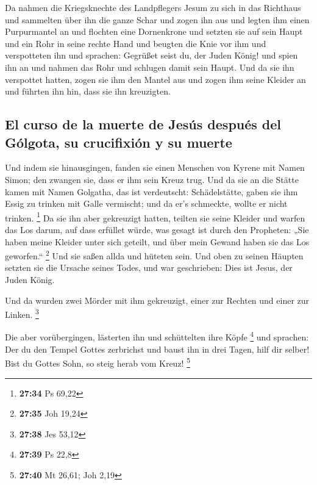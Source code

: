  Da nahmen die Kriegsknechte des Landpflegers Jesum zu
sich in das Richthaus und sammelten über ihn die ganze Schar
 und zogen ihn aus und legten ihm einen Purpurmantel an
 und flochten eine Dornenkrone und setzten sie auf sein
Haupt und ein Rohr in seine rechte Hand und beugten die Knie vor ihm und
verspotteten ihn und sprachen: Gegrüßet seist du, der Juden König!
 und spien ihn an und nahmen das Rohr und schlugen damit
sein Haupt.  Und da sie ihn verspottet hatten, zogen sie
ihm den Mantel aus und zogen ihm seine Kleider an und führten ihn hin,
dass sie ihn kreuzigten.

\hypertarget{el-curso-de-la-muerte-de-jesuxfas-despuuxe9s-del-guxf3lgota-su-crucifixiuxf3n-y-su-muerte}{%
\subsection{El curso de la muerte de Jesús después del Gólgota, su
crucifixión y su
muerte}\label{el-curso-de-la-muerte-de-jesuxfas-despuuxe9s-del-guxf3lgota-su-crucifixiuxf3n-y-su-muerte}}

 Und indem sie hinausgingen, fanden sie einen Menschen
von Kyrene mit Namen Simon; den zwangen sie, dass er ihm sein Kreuz
trug.  Und da sie an die Stätte kamen mit Namen Golgatha,
das ist verdeutscht: Schädelstätte,  gaben sie ihm Essig
zu trinken mit Galle vermischt; und da er's schmeckte, wollte er nicht
trinken. \footnote{\textbf{27:34} Ps 69,22}  Da sie ihn
aber gekreuzigt hatten, teilten sie seine Kleider und warfen das Los
darum, auf dass erfüllet würde, was gesagt ist durch den Propheten: „Sie
haben meine Kleider unter sich geteilt, und über mein Gewand haben sie
das Los geworfen.`` \footnote{\textbf{27:35} Joh 19,24} 
Und sie saßen allda und hüteten sein.  Und oben zu seinen
Häupten setzten sie die Ursache seines Todes, und war geschrieben: Dies
ist Jesus, der Juden König.

 Und da wurden zwei Mörder mit ihm gekreuzigt, einer zur
Rechten und einer zur Linken. \footnote{\textbf{27:38} Jes 53,12}

 Die aber vorübergingen, lästerten ihn und schüttelten
ihre Köpfe \footnote{\textbf{27:39} Ps 22,8}  und
sprachen: Der du den Tempel Gottes zerbrichst und baust ihn in drei
Tagen, hilf dir selber! Bist du Gottes Sohn, so steig herab vom Kreuz!
\footnote{\textbf{27:40} Mt 26,61; Joh 2,19}

